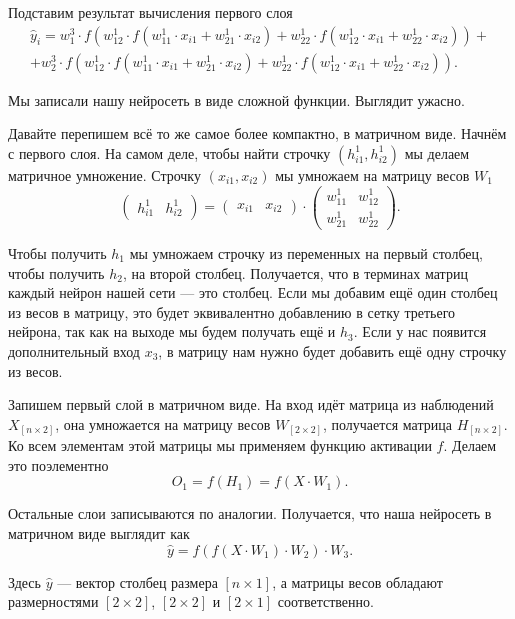 \begin{sol}
Подставим результат вычисления первого слоя 
\begin{multline*}
\hat{y}_i = w_1^3 \cdot f( w^1_{12} \cdot f( w^1_{11} \cdot x_{i1} +  w^1_{21} \cdot x_{i2}) +  w^1_{22} \cdot f( w^1_{12} \cdot x_{i1} +  w^1_{22} \cdot x_{i2})) + \\ + w_2^3 \cdot f( w^1_{12} \cdot f( w^1_{11} \cdot x_{i1} +  w^1_{21} \cdot x_{i2}) +  w^1_{22} \cdot f( w^1_{12} \cdot x_{i1} +  w^1_{22} \cdot x_{i2})).
\end{multline*}

Мы записали нашу нейросеть в виде сложной функции. Выглядит ужасно. 

Давайте перепишем всё то же самое более компактно, в матричном виде. Начнём с первого слоя. На самом деле, чтобы найти строчку $(h^1_{i1}, h^1_{i2})$ мы делаем матричное умножение. Строчку $(x_{i1},  x_{i2})$ мы умножаем на матрицу весов $W_1$
\begin{equation*} 
    \begin{pmatrix} h^1_{i1} & h^1_{i2} \end{pmatrix} =  \begin{pmatrix} x_{i1} &  x_{i2}\end{pmatrix} \cdot \begin{pmatrix} w^1_{11} &  w^1_{12} \\ w^1_{21} & w^1_{22}\end{pmatrix}.
\end{equation*} 

Чтобы получить $h_1$ мы умножаем строчку из переменных на первый столбец, чтобы получить $h_2$, на второй столбец. Получается, что в терминах матриц каждый нейрон нашей сети --- это столбец. Если мы добавим ещё один столбец из весов в матрицу, это будет эквивалентно добавлению в сетку третьего нейрона, так как на выходе мы будем получать ещё и $h_3$. Если у нас появится дополнительный вход $x_3$, в матрицу нам нужно будет добавить ещё одну строчку из весов. 

Запишем первый слой в матричном виде. На вход идёт матрица из наблюдений $X_{[n \times 2]}$, она умножается на матрицу весов $W_{[2 \times 2]}$, получается матрица $H_{[n \times 2]}$. Ко всем элементам этой матрицы мы применяем функцию активации $f$. Делаем это поэлементно
\[
O_1 = f(H_1) = f(X\cdot W_1).
\]

Остальные слои записываются по аналогии. Получается, что наша нейросеть в матричном виде выглядит как 
\[
\hat{y} = f(f(X\cdot W_1) \cdot W_2) \cdot W_3.
\]

Здесь $\hat{y}$ --- вектор столбец размера $[n \times 1]$, а матрицы весов обладают размерностями $[2 \times 2]$, $[2 \times 2]$ и $[2 \times 1]$ соответственно. 


\end{sol}

